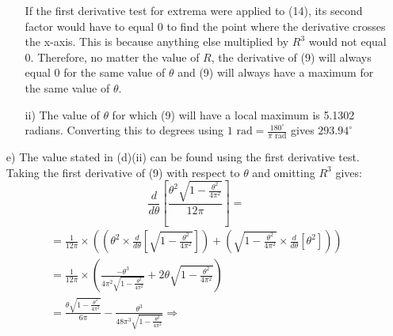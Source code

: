 \documentclass{article}
\begin{document}
\begin{itemize}
\begin{itemize}
        If the first derivative test for extrema were applied to (14), its second factor would have to equal 0 to find the point where the derivative crosses the x-axis. This is because anything else multiplied by \(R^3\) would not equal 0. Therefore, no matter the value of \(R\), the derivative of (9) will always equal 0 for the same value of \(\theta\) and (9) will always have a maximum for the same value of \(\theta\).
        
        \item[ii)]
        The value of \(\theta\) for which (9) will have a local maximum is 5.1302 radians.
        \newline Converting this to degrees using \(1\mbox{ rad}=\frac{180^\circ}{\pi\mbox{ rad}}\) gives \(293.94^\circ\)
        
    \end{itemize}
    
    
    \item[e)]
    The value stated in (d)(ii) can be found using the first derivative test. Taking the first derivative of (9) with respect to \(\theta\) and omitting \(R^3\) gives:
    \[ \frac{d}{d\theta}\left[\frac{\theta^2\sqrt{1-\frac{\theta^2}{4\pi^2}}}{12\pi}\right]=\]
    \begin{align*}
        = \frac{1}{12\pi}\times\left(\left(\theta^2\times\frac{d}{d\theta}\left[ \sqrt{1-\frac{\theta^2}{4\pi^2}} \right] \right)+\left( \sqrt{1-\frac{\theta^2}{4\pi^2}}\times\frac{d}{d\theta}\left[ \theta^2 \right] \right)\right) \\
        = \frac{1}{12\pi} \times \left(\frac{-\theta^3}{4\pi^2\sqrt{1-\frac{\theta^2}{4\pi^2}}} + 2\theta\sqrt{1-\frac{\theta^2}{4\pi^2}}\right) \\
        = \frac{\theta\sqrt{1-\frac{\theta^2}{4\pi^2}}}{6\pi}-\frac{\theta^3}{48\pi^3\sqrt{1-\frac{\theta^2}{4\pi^2}}}\Rightarrow
    \end{align*}
    

\end{itemize}
\end{document}
